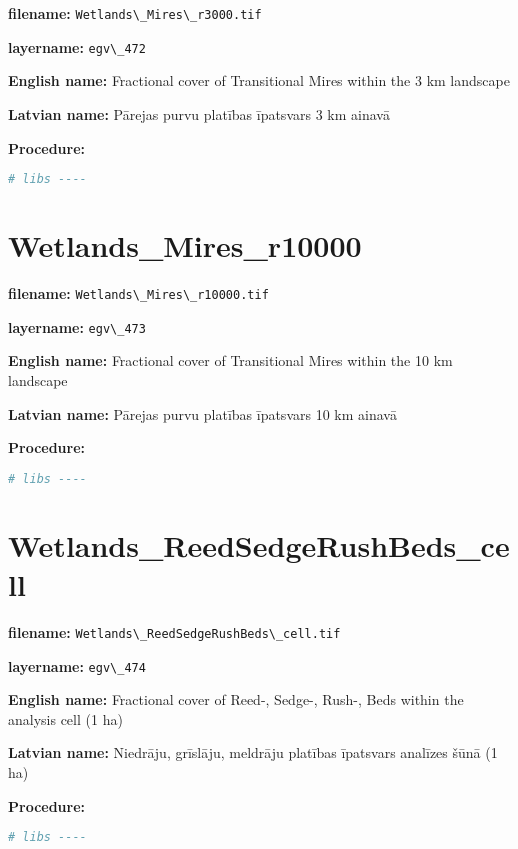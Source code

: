 \documentclass[
]{book}
\newcommand{\passthrough}[1]{#1}
\begin{document}
\textbf{filename:} \passthrough{\lstinline!Wetlands\_Mires\_r3000.tif!}

\textbf{layername:} \passthrough{\lstinline!egv\_472!}

\textbf{English name:} Fractional cover of Transitional Mires within the 3 km landscape

\textbf{Latvian name:} Pārejas purvu platības īpatsvars 3 km ainavā

\textbf{Procedure:}

\begin{lstlisting}[language=R]
# libs ----
\end{lstlisting}

\section{Wetlands\_Mires\_r10000}\label{ch06.473}

\textbf{filename:} \passthrough{\lstinline!Wetlands\_Mires\_r10000.tif!}

\textbf{layername:} \passthrough{\lstinline!egv\_473!}

\textbf{English name:} Fractional cover of Transitional Mires within the 10 km landscape

\textbf{Latvian name:} Pārejas purvu platības īpatsvars 10 km ainavā

\textbf{Procedure:}

\begin{lstlisting}[language=R]
# libs ----
\end{lstlisting}

\section{Wetlands\_ReedSedgeRushBeds\_cell}\label{ch06.474}

\textbf{filename:} \passthrough{\lstinline!Wetlands\_ReedSedgeRushBeds\_cell.tif!}

\textbf{layername:} \passthrough{\lstinline!egv\_474!}

\textbf{English name:} Fractional cover of Reed-, Sedge-, Rush-, Beds within the analysis cell (1 ha)

\textbf{Latvian name:} Niedrāju, grīslāju, meldrāju platības īpatsvars analīzes šūnā (1 ha)

\textbf{Procedure:}

\begin{lstlisting}[language=R]
# libs ----
\end{lstlisting}
\end{document}
